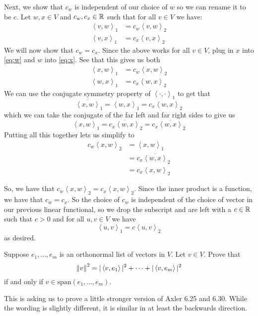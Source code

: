 \documentclass[answers]{exam}
\newcommand{\ip}[1]{\left\langle#1\right\rangle}
\begin{document}
\begin{questions}
\begin{solution}
        Next, we show that $c_w$ is independent of our choice of $w$ so we can rename it to be $c$.
        Let $w,x\in V$ and $c_w,c_x\in\mathbb{R}$ such that for all $v\in V$ we have:
        \begin{align}
            \ip{v,w}_1 &= c_w\ip{v,w}_2 \label{eq:w}\\
            \ip{v,x}_1 &= c_x\ip{v,x}_2 \label{eq:x}
        \end{align}
        We will now show that $c_w = c_x$. Since the above works for all $v\in V$, plug in $x$ into \eqref{eq:w}
        and $w$ into \eqref{eq:x}. See that this gives us both
        \begin{align*}
            \ip{x,w}_1 &= c_w\ip{x,w}_2 \\
            \ip{w,x}_1 &= c_x\ip{w,x}_2
        \end{align*}
        We can use the conjugate symmetry property of $\ip{\cdot,\cdot}_1$ to get that
        \[
            \overline{\ip{x,w}}_1 = \ip{w,x}_1 = c_x\ip{w,x}_2
        \]
        which we can take the conjugate of the far left and far right sides to give us
        \[
            \ip{x,w}_1 = \overline{c_x\ip{w,x}}_2 = c_x\overline{\ip{w,x}}_2
        \]
        Putting all this together lets us simplify to
        \begin{align*}
            c_w\ip{x,w}_2 &= \ip{x,w}_1 \\
            &= c_x\overline{\ip{w,x}}_2 \\
            &= c_x\ip{x,w}_2
        \end{align*}

        So, we have that $c_w\ip{x,w}_2 = c_x\ip{x,w}_2$. Since the inner product is a function, we have that
        $c_w = c_x$. So the choice of $c_w$ is independent of the choice of vector in our previous linear 
        functional, so we drop the subscript and are left with a $c\in\mathbb{R}$ such that $c>0$ and for all $u,v\in V$
        we have
        \[
            \ip{u,v}_1 = c\ip{u,v}_2
        \]
        as desired.
    \end{solution}
    \question Suppose $e_1,\dots,e_m$ is an orthonormal list of vectors in $V$. Let $v\in V$. Prove that
    \[
        \norm{v}{}^2 = |\ip{v,e_1}|^2 + \cdots + |\ip{v,e_m}|^2
    \]
    if and only if $v\in\text{span}\left({e_1,\dots,e_m}\right)$.
    \begin{solution}

         This is asking us to prove a little stronger version of Axler 6.25 and 6.30. While the
        wording is slightly different, it is similar in at least the backwards direction.
    \end{solution}
\end{questions}

\end{document}
